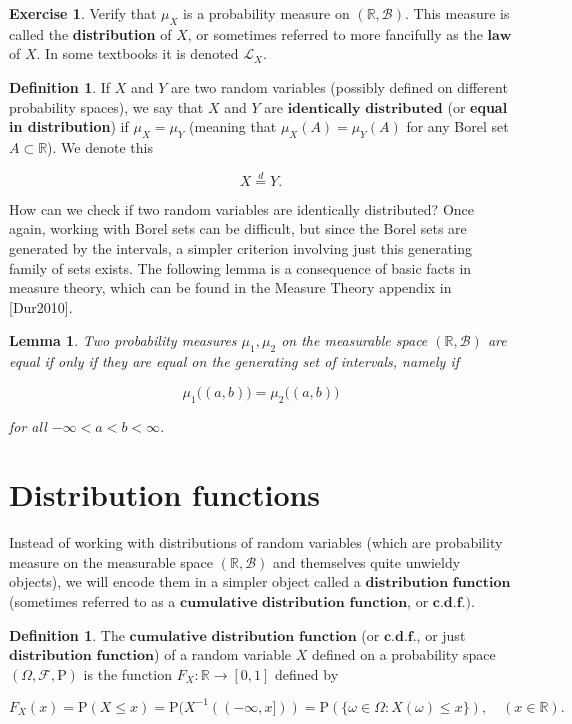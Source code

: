 \documentclass[11pt]{report}
\providecommand{\cal}{\mathcal}
\newcommand{\R}{\mathbb{R}}
\theoremstyle{plain}
\newtheorem{lem}[thm]{Lemma}
\theoremstyle{definition}
\newtheorem{defn}[thm]{Definition}
\newtheorem{xexercise}[thm]{Exercise}
\begin{document}
\begin{xexercise}
Verify that $\mu_X$ is a probability measure on
$(\R, {\cal B})$. This measure is called the
\textbf{distribution} of $X$, or sometimes referred
to more fancifully as the $\textbf{law}$ of $X$. In
some textbooks it is denoted ${\cal L}_X$.
\end{xexercise}

\begin{defn}
If $X$ and $Y$ are two random variables (possibly
defined on different probability spaces), we say that
$X$ and $Y$ are $\textbf{identically distributed}$
(or \textbf{equal in distribution}) if $\mu_X = \mu_Y$
(meaning that $\mu_X(A) = \mu_Y(A)$ for any Borel set
$A\subset \R$). We denote this

\[
X \stackrel{d}{=} Y.
\]

\end{defn}

\noindent How can we check if two random variables are
identically distributed? Once again, working with
Borel sets can be difficult, but since the Borel sets
are generated by the intervals, a simpler criterion
involving just this generating family of sets exists.
The following lemma is a consequence of basic facts in
measure theory, which can be found in the Measure
Theory appendix in [Dur2010].

\begin{lem}
Two probability measures $\mu_1, \mu_2$ on the
measurable space $(\R, {\cal B})$ are equal if only
if they are equal on the generating set of intervals,
namely if

\[
\mu_1\big((a,b)\big) = \mu_2\big((a,b)\big)
\]

\noindent for all $-\infty < a<b < \infty$.
\end{lem}

\section{Distribution functions}
\label{sec:dist-funs}

Instead of working with distributions of random
variables (which are probability measure on the
measurable space $(\R, {\cal B})$ and themselves
quite unwieldy objects), we will encode them in a
simpler object called a
$\textbf{distribution function}$ (sometimes referred
to as a $\textbf{cumulative distribution function}$,
or $\textbf{c.d.f.})$.

\begin{defn}
The $\textbf{cumulative distribution function}$ (or
$\textbf{c.d.f.}$, or just
$\textbf{distribution function}$) of a random
variable $X$ defined on a probability space
$(\Omega, {\cal F}, \mathrm{P})$ is the function
$F_X:\R \to [0,1]$ defined by

\[
F_X(x) = \mathrm{P}( X \le x ) = \mathrm{P}( X^{-1}((-\infty,x])) = \mathrm{P}( \{ \omega \in \Omega : X(\omega) \le x \} ),
\quad (x\in \R).
\]

\end{defn}
\end{document}
